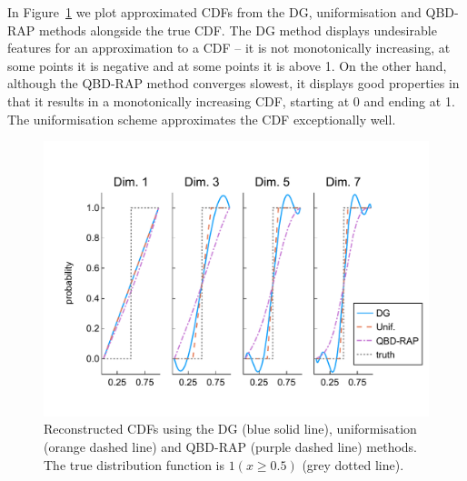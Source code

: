\begin{example}
In Figure~\ref{fig: pdf comp fun 1} we plot approximated CDFs from the DG, uniformisation and QBD-RAP methods alongside the true CDF. The DG method displays undesirable features for an approximation to a CDF -- it is not monotonically increasing, at some points it is negative and at some points it is above 1. On the other hand, although the QBD-RAP method converges slowest, it displays good properties in that it results in a monotonically increasing CDF, starting at 0 and ending at 1. The uniformisation scheme approximates the CDF exceptionally well.
\begin{figure}[h]
	\centering
	\includegraphics[width=\textwidth,trim={0cm 1.25cm 0cm 1.25cm},clip]{chapter6/figs/comp/fun1/cdfs_formatted.pdf}
	\caption{Reconstructed CDFs using the DG (blue solid line), uniformisation (orange dashed line) and QBD-RAP (purple dashed line) methods. The true distribution function is \(1(x\geq 0.5)\) (grey dotted line).}
	\label{fig: pdf comp fun 1}
\end{figure} 
\exampleFloatBarrier
\end{example}

